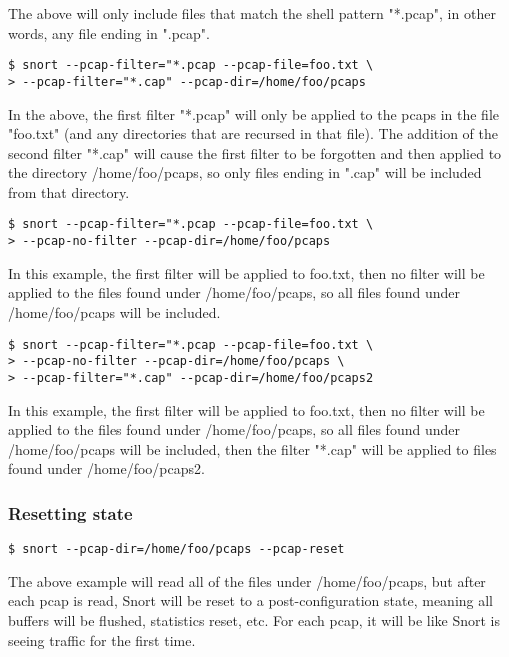 \documentclass[english]{report}
\begin{document}
The above will only include files that match the shell pattern "*.pcap",
in other words, any file ending in ".pcap".

\begin{verbatim}
$ snort --pcap-filter="*.pcap --pcap-file=foo.txt \
> --pcap-filter="*.cap" --pcap-dir=/home/foo/pcaps
\end{verbatim}

In the above, the first filter "*.pcap" will only be applied to the
pcaps in the file "foo.txt" (and any directories that are recursed
in that file).  The addition of the second filter "*.cap" will cause
the first filter to be forgotten and then applied to the directory
/home/foo/pcaps, so only files ending in ".cap" will be included from
that directory.

\begin{verbatim}
$ snort --pcap-filter="*.pcap --pcap-file=foo.txt \
> --pcap-no-filter --pcap-dir=/home/foo/pcaps
\end{verbatim}

In this example, the first filter will be applied to foo.txt, then
no filter will be applied to the files found under /home/foo/pcaps,
so all files found under /home/foo/pcaps will be included. 

\begin{verbatim}
$ snort --pcap-filter="*.pcap --pcap-file=foo.txt \
> --pcap-no-filter --pcap-dir=/home/foo/pcaps \
> --pcap-filter="*.cap" --pcap-dir=/home/foo/pcaps2
\end{verbatim}

In this example, the first filter will be applied to foo.txt, then
no filter will be applied to the files found under /home/foo/pcaps,
so all files found under /home/foo/pcaps will be included, then the
filter "*.cap" will be applied to files found under /home/foo/pcaps2. 

\subsubsection{Resetting state}

\begin{verbatim}
$ snort --pcap-dir=/home/foo/pcaps --pcap-reset
\end{verbatim}

The above example will read all of the files under /home/foo/pcaps, but 
after each pcap is read, Snort will be reset to a post-configuration 
state, meaning all buffers will be flushed, statistics reset, etc.  For
each pcap, it will be like Snort is seeing traffic for the first time.
\end{document}
